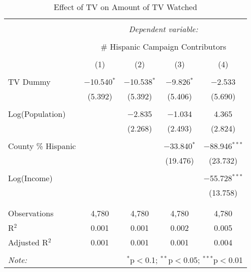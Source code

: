 
\begin{table}[!htbp] \centering 
  \caption{Effect of TV on Amount of TV Watched} 
  \label{} 
\begin{tabular}{@{\extracolsep{-5pt}}lcccc} 
\\[-1.8ex]\hline 
\hline \\[-1.8ex] 
 & \multicolumn{4}{c}{\textit{Dependent variable:}} \\ 
\cline{2-5} 
\\[-1.8ex] & \multicolumn{4}{c}{\# Hispanic Campaign Contributors} \\ 
\\[-1.8ex] & (1) & (2) & (3) & (4)\\ 
\hline \\[-1.8ex] 
 TV Dummy & $-$10.540$^{*}$ & $-$10.538$^{*}$ & $-$9.826$^{*}$ & $-$2.533 \\ 
  & (5.392) & (5.392) & (5.406) & (5.690) \\ 
  & & & & \\ 
 Log(Population) &  & $-$2.835 & $-$1.034 & 4.365 \\ 
  &  & (2.268) & (2.493) & (2.824) \\ 
  & & & & \\ 
 County \% Hispanic &  &  & $-$33.840$^{*}$ & $-$88.946$^{***}$ \\ 
  &  &  & (19.476) & (23.732) \\ 
  & & & & \\ 
 Log(Income) &  &  &  & $-$55.728$^{***}$ \\ 
  &  &  &  & (13.758) \\ 
  & & & & \\ 
\hline \\[-1.8ex] 
Observations & 4,780 & 4,780 & 4,780 & 4,780 \\ 
R$^{2}$ & 0.001 & 0.001 & 0.002 & 0.005 \\ 
Adjusted R$^{2}$ & 0.001 & 0.001 & 0.001 & 0.004 \\ 
\hline 
\hline \\[-1.8ex] 
\textit{Note:}  & \multicolumn{4}{r}{$^{*}$p$<$0.1; $^{**}$p$<$0.05; $^{***}$p$<$0.01} \\ 
\end{tabular} 
\end{table} 
